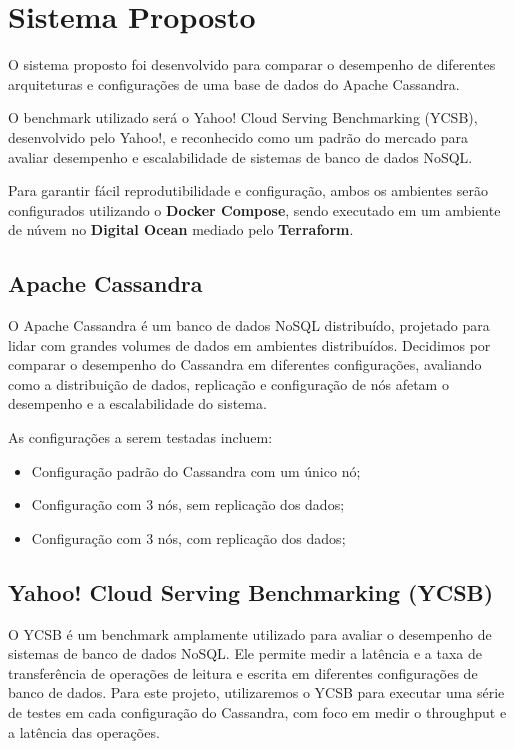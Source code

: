 \section{Sistema Proposto}

O sistema proposto foi desenvolvido para comparar o desempenho de diferentes arquiteturas e configurações de uma base de dados do Apache Cassandra.

O benchmark utilizado será o Yahoo! Cloud Serving Benchmarking (YCSB), desenvolvido pelo Yahoo!,
e reconhecido como um padrão do mercado para avaliar desempenho e escalabilidade de sistemas 
de banco de dados NoSQL. 

Para garantir fácil reprodutibilidade e configuração, 
ambos os ambientes serão configurados utilizando o \textbf{Docker Compose}, sendo executado em um ambiente de núvem no \textbf{Digital Ocean} 
mediado pelo \textbf{Terraform}.

\subsection{Apache Cassandra}
	O Apache Cassandra é um banco de dados NoSQL distribuído, projetado para lidar com grandes volumes de dados em ambientes distribuídos.
	Decidimos por comparar o desempenho do Cassandra em diferentes configurações,
	avaliando como a distribuição de dados, replicação e configuração de nós afetam o desempenho e a escalabilidade do sistema.

	As configurações a serem testadas incluem:
	\begin{itemize}
		\item Configuração padrão do Cassandra com um único nó;
		\item Configuração com 3 nós, sem replicação dos dados;
		\item Configuração com 3 nós, com replicação dos dados;
	\end{itemize}

\subsection{Yahoo! Cloud Serving Benchmarking (YCSB)}
	O YCSB é um benchmark amplamente utilizado para avaliar o desempenho de sistemas de banco de dados NoSQL.
	Ele permite medir a latência e a taxa de transferência de operações de leitura e escrita em diferentes configurações de banco de dados.
	Para este projeto, utilizaremos o YCSB para executar uma série de testes em cada configuração do Cassandra,
	com foco em medir o throughput e a latência das operações.

